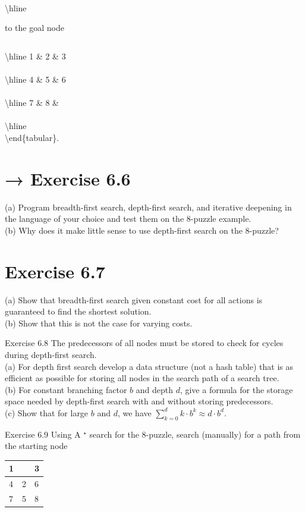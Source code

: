 \documentclass[10pt]{book}
\begin{document}
\\
\textbackslash hline

 to the goal node \begin{tabular}{|l|l|l|l|}
\end{tabular}

\textbackslash hline 1 \& 2 \& 3 \\
\\
\textbackslash hline 4 \& 5 \& 6 \\
\\
\textbackslash hline 7 \& 8 \& \\
\\
\textbackslash hline\\
\textbackslash end\{tabular\}.

\section*{→ Exercise 6.6}
(a) Program breadth-first search, depth-first search, and iterative deepening in the language of your choice and test them on the 8-puzzle example.\\
(b) Why does it make little sense to use depth-first search on the 8-puzzle?

\section*{Exercise 6.7}
(a) Show that breadth-first search given constant cost for all actions is guaranteed to find the shortest solution.\\
(b) Show that this is not the case for varying costs.

Exercise 6.8 The predecessors of all nodes must be stored to check for cycles during depth-first search.\\
(a) For depth first search develop a data structure (not a hash table) that is as efficient as possible for storing all nodes in the search path of a search tree.\\
(b) For constant branching factor $b$ and depth $d$, give a formula for the storage space needed by depth-first search with and without storing predecessors.\\
(c) Show that for large $b$ and $d$, we have $\sum_{k=0}^{d} k \cdot b^{k} \approx d \cdot b^{d}$.

Exercise 6.9 Using A ${ }^{\star}$ search for the 8-puzzle, search (manually) for a path from the starting node

\begin{center}
\begin{tabular}{||l|l|l||}
\hline
1 &  & 3 \\
\hline
4 & 2 & 6 \\
\hline
7 & 5 & 8 \\
\hline
\end{tabular}
\end{center}
\end{document}
